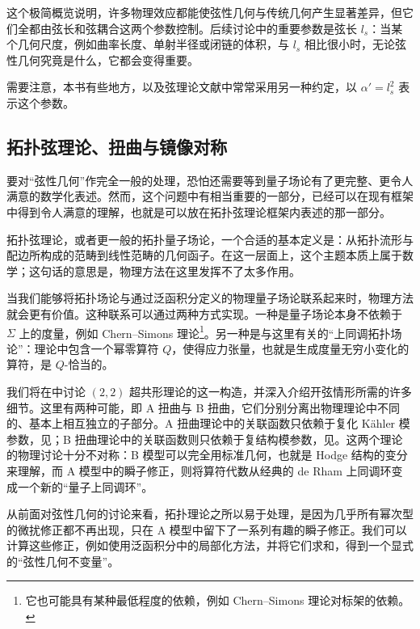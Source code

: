 这个极简概览说明，许多物理效应都能使弦性几何与传统几何产生显著差异，但它们全都由弦长和弦耦合这两个参数控制。后续讨论中的重要参数是弦长 $l_s$：当某个几何尺度，例如曲率长度、单射半径或闭链的体积，与 $l_s$ 相比很小时，无论弦性几何究竟是什么，它都会变得重要。

需要注意，本书有些地方，以及弦理论文献中常常采用另一种约定，以 $\alpha'=l_s^2$ 表示这个参数。

\subsection{拓扑弦理论、扭曲与镜像对称}\label{sec:1.1.2}

要对“弦性几何”作完全一般的处理，恐怕还需要等到量子场论有了更完整、更令人满意的数学化表述。然而，这个问题中有相当重要的一部分，已经可以在现有框架中得到令人满意的理解，也就是可以放在拓扑弦理论框架内表述的那一部分。

拓扑弦理论，或者更一般的拓扑量子场论，一个合适的基本定义是：从拓扑流形与配边所构成的范畴到线性范畴的几何函子。在这一层面上，这个主题本质上属于数学；这句话的意思是，物理方法在这里发挥不了太多作用。

当我们能够将拓扑场论与通过泛函积分定义的物理量子场论联系起来时，物理方法就会更有价值。这种联系可以通过两种方式实现。一种是量子场论本身不依赖于 $\Sigma$ 上的度量，例如 Chern--Simons 理论\footnote{它也可能具有某种最低程度的依赖，例如 Chern--Simons 理论对标架的依赖。}。另一种是与这里有关的“上同调拓扑场论”：理论中包含一个幂零算符 $Q$，使得应力张量，也就是生成度量无穷小变化的算符，是 $Q$-恰当的。

我们将在中讨论 $(2,2)$ 超共形理论的这一构造，并深入介绍开弦情形所需的许多细节。这里有两种可能，即 A 扭曲与 B 扭曲，它们分别分离出物理理论中不同的、基本上相互独立的子部分。A 扭曲理论中的关联函数只依赖于复化 Kähler 模参数，见；B 扭曲理论中的关联函数则只依赖于复结构模参数，见。这两个理论的物理讨论十分不对称：B 模型可以完全用标准几何，也就是 Hodge 结构的变分来理解，而 A 模型中的瞬子修正，则将算符代数从经典的 de Rham 上同调环变成一个新的“量子上同调环”。

从前面对弦性几何的讨论来看，拓扑理论之所以易于处理，是因为几乎所有幂次型的微扰修正都不再出现，只在 A 模型中留下了一系列有趣的瞬子修正。我们可以计算这些修正，例如使用泛函积分中的局部化方法，并将它们求和，得到一个显式的“弦性几何不变量”。


